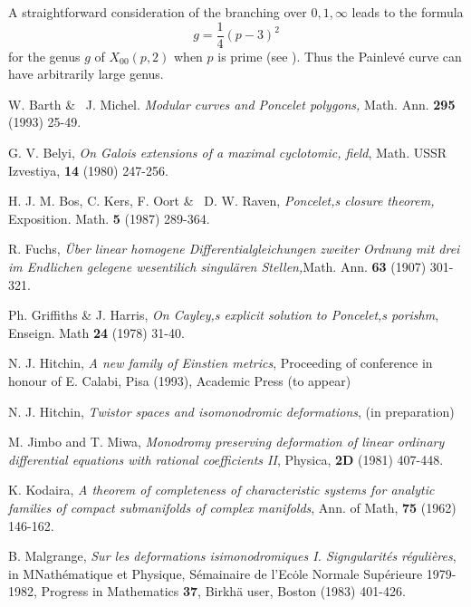 \begin{remark*}
A straightforward consideration of the branching over $0,1,\infty$ leads to the formula
$$
g = \dfrac{1}{4}(p-3)^{2}
$$
for the genus $g$ of $X_{00}(p,2)$ when $p$ is prime (see \cite{art7-key1}). Thus the Painlev\'e curve can have arbitrarily large genus.
\end{remark*}

\begin{thebibliography}{99}
 W. Barth \& \ J. Michel. \textit{Modular curves and Poncelet polygons,} Math. Ann. {\bf 295} (1993) 25-49.

 G. V. Belyi, \textit{On Galois extensions of a maximal cyclotomic, field}, Math. USSR Izvestiya,
{\bf 14} (1980) 247-256.

 H. J. M. Bos, C. Kers, F. Oort \& \ D. W. Raven, \textit{Poncelet,s closure theorem,} Exposition. Math. {\bf 5} (1987) 289-364.

 R. Fuchs, \textit{\"Uber linear homogene Differentialgleichungen zweiter Ordnung mit drei im Endlichen gelegene wesentilich singul\"aren Stellen,}Math. Ann. {\bf 63} (1907) 301-321.

 Ph. Griffiths \& J. Harris, \textit{On Cayley,s explicit solution to Poncelet,s porishm}, Enseign. Math {\bf 24} (1978) 31-40.

 N. J. Hitchin, \textit{A new family of Einstien metrics}, Proceeding of conference in honour of E. Calabi, Pisa (1993), Academic Press (to appear)

 N. J. Hitchin, \textit{Twistor spaces and isomonodromic deformations}, (in preparation)

 M. Jimbo and T. Miwa, \textit{Monodromy preserving deformation of linear ordinary differential equations with rational coefficients II}, Physica, {\bf 2D} (1981) 407-448.

 K. Kodaira, \textit{A theorem of completeness of characteristic systems for analytic families of compact submanifolds of complex manifolds}, Ann. of Math, {\bf 75} (1962) 146-162.
 
 B. Malgrange, \textit{Sur les deformations isimonodromiques I. Signgularit\'es r\'eguli\`eres}, in MNath\'ematique et Physique, S\'emainaire de l'Ec\.{o}le Normale Sup\'erieure 1979-1982, Progress in Mathematics
{\bf 37}, Birkh\"a user, Boston (1983) 401-426.


\end{thebibliography}
